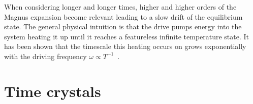 
When considering longer and longer times, higher and higher orders of the Magnus expansion become relevant leading to a slow drift of the equilibrium state. The general physical intuition is that the drive pumps energy into the system heating it up until it reaches a featureless infinite temperature state\cite{dalessioLongtimeBehaviorIsolated2014,bukovUniversalHighfrequencyBehavior2015}. It has been shown that the timescale this heating occurs on grows exponentially with the driving frequency $\omega\propto T^{-1}$~\cite{kuwaharaFloquetMagnusTheory2016,abaninRigorousTheoryManyBody2017}.

%
%

\section{Time crystals}

